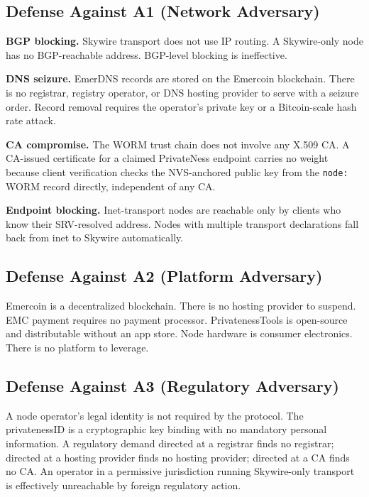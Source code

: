 \documentclass[11pt,a4paper]{article}
\theoremstyle{definition}
\begin{document}
\subsection{Defense Against A1 (Network Adversary)}

\textbf{BGP blocking.}  Skywire transport does not use IP routing.  A Skywire-only
node has no BGP-reachable address.  BGP-level blocking is ineffective.

\textbf{DNS seizure.}  EmerDNS records are stored on the Emercoin blockchain.
There is no registrar, registry operator, or DNS hosting provider to serve with
a seizure order.  Record removal requires the operator's private key or a Bitcoin-scale
hash rate attack.

\textbf{CA compromise.}  The WORM trust chain does not involve any X.509 CA.
A CA-issued certificate for a claimed PrivateNess endpoint carries no weight
because client verification checks the NVS-anchored public key from the
\texttt{node:} WORM record directly, independent of any CA.

\textbf{Endpoint blocking.}  Inet-transport nodes are reachable only by clients
who know their SRV-resolved address.  Nodes with multiple transport declarations
fall back from inet to Skywire automatically.

\subsection{Defense Against A2 (Platform Adversary)}

Emercoin is a decentralized blockchain.  There is no hosting provider to
suspend.  EMC payment requires no payment processor.  PrivatenessTools is
open-source and distributable without an app store.  Node hardware is
consumer electronics.  There is no platform to leverage.

\subsection{Defense Against A3 (Regulatory Adversary)}

A node operator's legal identity is not required by the protocol.
The privatenessID is a cryptographic key binding with no mandatory
personal information.  A regulatory demand directed at a registrar
finds no registrar; directed at a hosting provider finds no hosting
provider; directed at a CA finds no CA.  An operator in a permissive
jurisdiction running Skywire-only transport is effectively unreachable
by foreign regulatory action.
\end{document}
